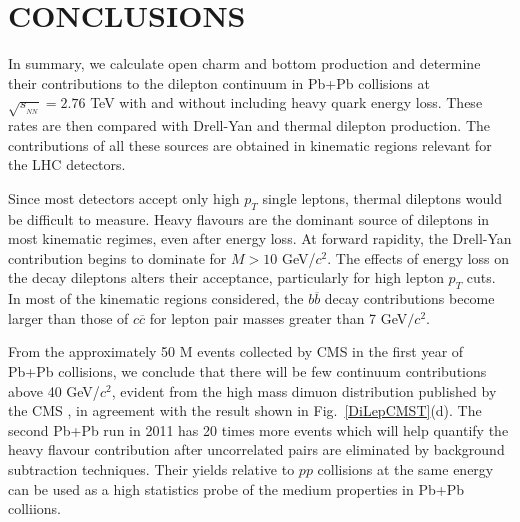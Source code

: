 \section{CONCLUSIONS}
In summary, we calculate open charm and bottom production and determine 
their contributions to the dilepton continuum in Pb+Pb collisions at 
$\sqrt{s_{_{NN}}} = 2.76$ TeV with and without including heavy quark energy loss.
These rates are then compared with Drell-Yan and thermal dilepton production.
The contributions of all these sources are obtained in kinematic regions 
relevant for the LHC detectors. 
  
Since most detectors accept only high $p_T$ single leptons, thermal dileptons 
would be difficult to measure.  Heavy flavours are the dominant source of 
dileptons in most kinematic regimes, even after energy loss. 
At forward rapidity, the Drell-Yan contribution begins to dominate for
$M > 10$ GeV/$c^2$.  The effects of energy loss on the decay dileptons alters 
their acceptance, particularly for high lepton $p_T$ cuts.  In most of the 
kinematic regions considered, the $b \overline b$ decay contributions become 
larger than those of $c \overline c$ for lepton pair masses greater than 
7 GeV$/c^2$. 
 
  From the approximately 50 M events collected by CMS in the first year of
Pb+Pb collisions, we conclude that there will be few continuum contributions 
above 40 GeV/$c^2$, evident from the high mass dimuon
distribution published by the CMS \cite{zboson}, in agreement with the result
shown in Fig.~\ref{DiLepCMST}(d). The second Pb+Pb run in 2011 has 20 times more
events which will help quantify the heavy flavour contribution after 
uncorrelated pairs are eliminated by background subtraction techniques.
 Their yields relative to $pp$ collisions at the 
same energy can be used as a high 
statistics probe of the medium properties in Pb+Pb colliions.


